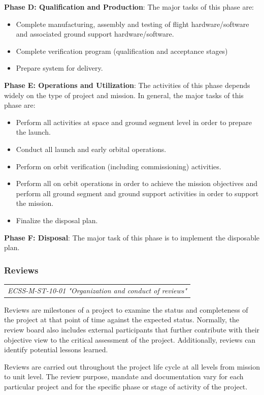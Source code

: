 \textbf{Phase D: Qualification and Production}: The major tasks of this phase are:
\begin{itemize}
\item Complete manufacturing, assembly and testing of flight hardware/software and associated ground support hardware/software.
\item Complete verification program (qualification and acceptance stages)
\item Prepare system for delivery.
\end{itemize}

\textbf{Phase E: Operations and Utilization}: The activities of this phase depends widely on the type of project and mission. In general, the major tasks of this phase are:
\begin{itemize}
\item Perform all activities at space and ground segment level in order to prepare the launch.
\item Conduct all launch and early orbital operations.
\item Perform on orbit verification (including commissioning) activities.
\item Perform all on orbit operations in order to achieve the mission objectives and perform all ground segment and ground support activities in order to support the mission.
\item Finalize the disposal plan.
\end{itemize}

\textbf{Phase F: Disposal}: The major task of this phase is to implement the disposable plan.

\subsubsection{Reviews}

\begin{tabular}{l}
\textit{ECSS-M-ST-10-01 "Organization and conduct of reviews" \cite{ECSS-M-ST-10-01}} 
\end{tabular}

Reviews are milestones of a project to examine the status and completeness of the project at that point of time against the expected status. Normally, the review board also includes external participants that further contribute with their objective view to the critical assessment of the project. Additionally, reviews can identify potential lessons learned.

Reviews are carried out throughout the project life cycle at all levels from mission to unit level. The review purpose, mandate and documentation vary for each particular project and for the specific phase or stage of activity of the project. 

